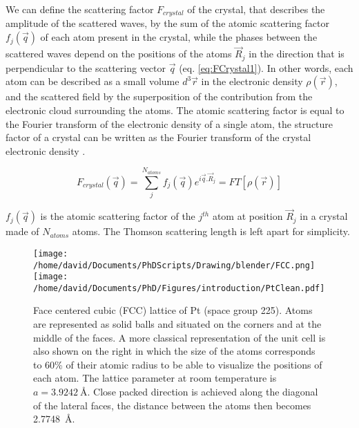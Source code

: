 We can define the scattering factor $F_{crystal}$ of the crystal, that describes the amplitude of the scattered waves, by the sum of the atomic scattering factor $f_j(\vec{q})$ of each atom present in the crystal, while the phases between the scattered waves depend on the positions of the atoms $\vec{R}_j$ in the direction that is perpendicular to the scattering vector $\vec{q}$ (eq. \ref{eq:FCrystal1}).
In other words, each atom can be described as a small volume $d^3\vec{r}$ in the electronic density $\rho(\vec{r})$, and the scattered field by the superposition of the contribution from the electronic cloud surrounding the atoms.
The atomic scattering factor is equal to the Fourier transform of the electronic density of a single atom, the structure factor of a crystal can be written as the Fourier transform of the crystal electronic density \parencite{Paganin}.

\begin{equation}
    \label{eq:FCrystal1}
    F_{crystal}(\vec{q}) = \sum_j^{N_{atoms}} f_j(\vec{q}) e^{i\vec{q}.\vec{R}_j} = FT[\rho(\vec{r})]
\end{equation}

$f_j(\vec{q})$ is the atomic scattering factor of the $j^{th}$ atom at position $\vec{R}_j$ in a crystal made of $N_{atoms}$ atoms.
The Thomson scattering length is left apart for simplicity.

\begin{figure}[!htb]
    \centering
    \texttt{[image: /home/david/Documents/PhDScripts/Drawing/blender/FCC.png]}
    \texttt{[image: /home/david/Documents/PhD/Figures/introduction/PtClean.pdf]}
    \caption{
    Face centered cubic (FCC) lattice of Pt (space group 225).
    Atoms are represented as solid balls and situated on the corners and at the middle of the faces.
    A more classical representation of the unit cell is also shown on the right in which the size of the atoms corresponds to 60\% of their atomic radius to be able to visualize the positions of each atom.
    The lattice parameter at room temperature is $a = \qty{3.9242}{\angstrom}$.
    Close packed direction is achieved along the diagonal of the lateral faces, the distance between the atoms then becomes \qty{2.7748}{\angstrom}.
    }
    \label{fig:fcc}
\end{figure}

